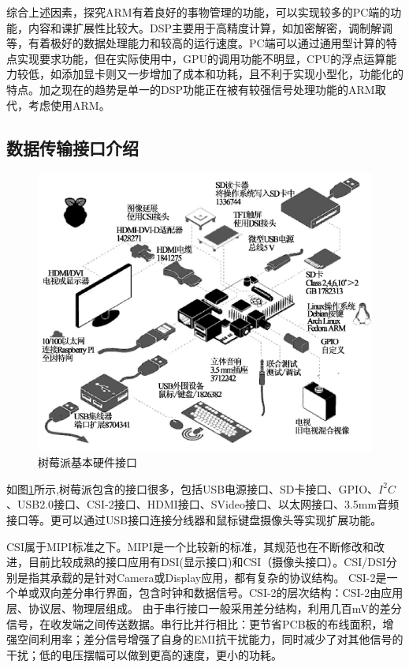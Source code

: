 综合上述因素，探究ARM有着良好的事物管理的功能，可以实现较多的PC端的功能，内容和课扩展性比较大。DSP主要用于高精度计算，如加密解密，调制解调等，有着极好的数据处理能力和较高的运行速度。PC端可以通过通用型计算的特点实现要求功能，但在实际使用中，GPU的调用功能不明显，CPU的浮点运算能力较低，如添加显卡则又一步增加了成本和功耗，且不利于实现小型化，功能化的特点。加之现在的趋势是单一的DSP功能正在被有较强信号处理功能的ARM取代，考虑使用ARM。



\subsection{数据传输接口介绍}

\begin{figure}[h]
	\centering
	\includegraphics[width=0.7\linewidth]{Figure/rasp_3}
	\caption{树莓派基本硬件接口}
	\label{fig:rasp_1}
\end{figure}

如图\ref{fig:rasp_1}所示,树莓派包含的接口很多，包括USB电源接口、SD卡接口、GPIO、$I^{2}C$、USB2.0接口、CSI-2接口、HDMI接口、SVideo接口、以太网接口、3.5mm音频接口等。更可以通过USB接口连接分线器和鼠标键盘摄像头等实现扩展功能\cite{IoT}。

CSI属于MIPI标准之下。MIPI是一个比较新的标准，其规范也在不断修改和改进，目前比较成熟的接口应用有DSI(显示接口)和CSI（摄像头接口）。CSI/DSI分别是指其承载的是针对Camera或Display应用，都有复杂的协议结构。
CSI-2是一个单或双向差分串行界面，包含时钟和数据信号。CSI-2的层次结构：CSI-2由应用层、协议层、物理层组成。
由于串行接口一般采用差分结构，利用几百mV的差分信号，在收发端之间传送数据。串行比并行相比：更节省PCB板的布线面积，增强空间利用率；差分信号增强了自身的EMI抗干扰能力，同时减少了对其他信号的干扰；低的电压摆幅可以做到更高的速度，更小的功耗。

